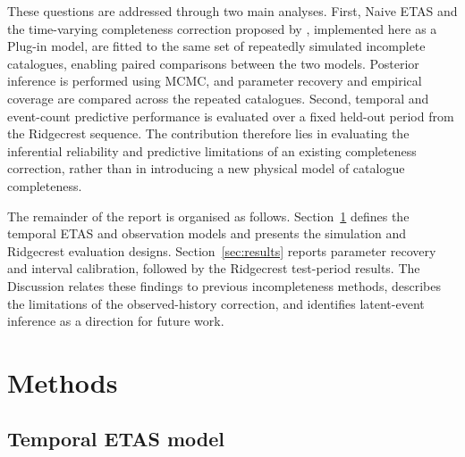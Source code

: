 \documentclass{statsmsc}
\begin{document}
These questions are addressed through two main analyses. First, Naive ETAS
and the time-varying completeness correction proposed by
\citet{kamranzad2025}, implemented here as a Plug-in model, are fitted to the
same set of repeatedly simulated incomplete catalogues, enabling paired
comparisons between the two models. Posterior inference is performed using
MCMC, and parameter recovery and empirical coverage are compared across the
repeated catalogues. Second, temporal and event-count predictive performance
is evaluated over a fixed held-out period from the Ridgecrest sequence. The
contribution therefore lies in evaluating the inferential reliability and
predictive limitations of an existing completeness correction, rather than in
introducing a new physical model of catalogue completeness.

The remainder of the report is organised as follows. Section~\ref{sec:methods}
defines the temporal ETAS and observation models and presents the simulation
and Ridgecrest evaluation designs. Section~\ref{sec:results} reports parameter
recovery and interval calibration, followed by the Ridgecrest test-period
results. The Discussion relates these findings to previous incompleteness
methods, describes the limitations of the observed-history correction, and
identifies latent-event inference as a direction for future work.



\section{Methods}\label{sec:methods}
\subsection{Temporal ETAS model}\label{subsec:temporal_etas}
\end{document}
